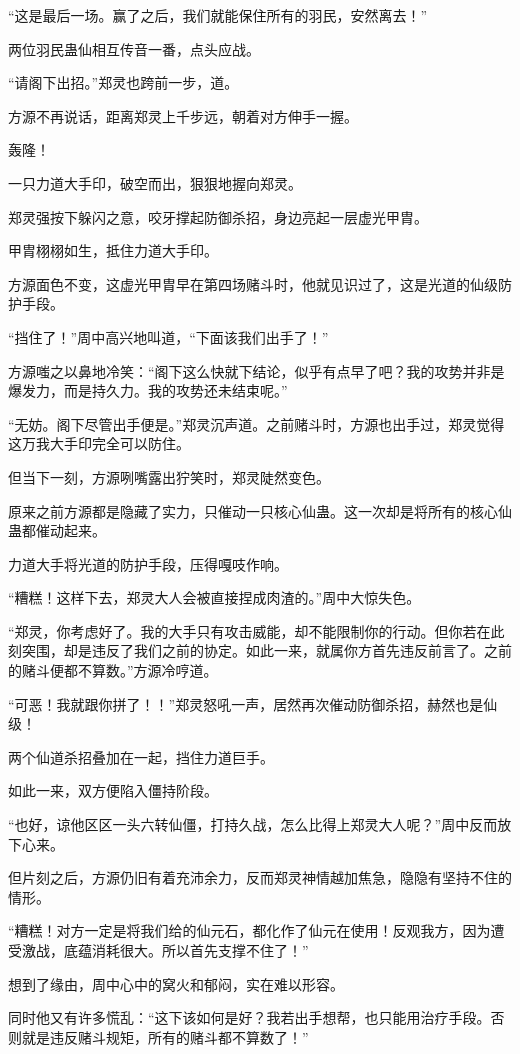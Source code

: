 \begin{this_body}
“这是最后一场。赢了之后，我们就能保住所有的羽民，安然离去！”

两位羽民蛊仙相互传音一番，点头应战。

“请阁下出招。”郑灵也跨前一步，道。

方源不再说话，距离郑灵上千步远，朝着对方伸手一握。

轰隆！

一只力道大手印，破空而出，狠狠地握向郑灵。

郑灵强按下躲闪之意，咬牙撑起防御杀招，身边亮起一层虚光甲胄。

甲胄栩栩如生，抵住力道大手印。

方源面色不变，这虚光甲胄早在第四场赌斗时，他就见识过了，这是光道的仙级防护手段。

“挡住了！”周中高兴地叫道，“下面该我们出手了！”

方源嗤之以鼻地冷笑：“阁下这么快就下结论，似乎有点早了吧？我的攻势并非是爆发力，而是持久力。我的攻势还未结束呢。”

“无妨。阁下尽管出手便是。”郑灵沉声道。之前赌斗时，方源也出手过，郑灵觉得这万我大手印完全可以防住。

但当下一刻，方源咧嘴露出狞笑时，郑灵陡然变色。

原来之前方源都是隐藏了实力，只催动一只核心仙蛊。这一次却是将所有的核心仙蛊都催动起来。

力道大手将光道的防护手段，压得嘎吱作响。

“糟糕！这样下去，郑灵大人会被直接捏成肉渣的。”周中大惊失色。

“郑灵，你考虑好了。我的大手只有攻击威能，却不能限制你的行动。但你若在此刻突围，却是违反了我们之前的协定。如此一来，就属你方首先违反前言了。之前的赌斗便都不算数。”方源冷哼道。

“可恶！我就跟你拼了！！”郑灵怒吼一声，居然再次催动防御杀招，赫然也是仙级！

两个仙道杀招叠加在一起，挡住力道巨手。

如此一来，双方便陷入僵持阶段。

“也好，谅他区区一头六转仙僵，打持久战，怎么比得上郑灵大人呢？”周中反而放下心来。

但片刻之后，方源仍旧有着充沛余力，反而郑灵神情越加焦急，隐隐有坚持不住的情形。

“糟糕！对方一定是将我们给的仙元石，都化作了仙元在使用！反观我方，因为遭受激战，底蕴消耗很大。所以首先支撑不住了！”

想到了缘由，周中心中的窝火和郁闷，实在难以形容。

同时他又有许多慌乱：“这下该如何是好？我若出手想帮，也只能用治疗手段。否则就是违反赌斗规矩，所有的赌斗都不算数了！”


\end{this_body}
